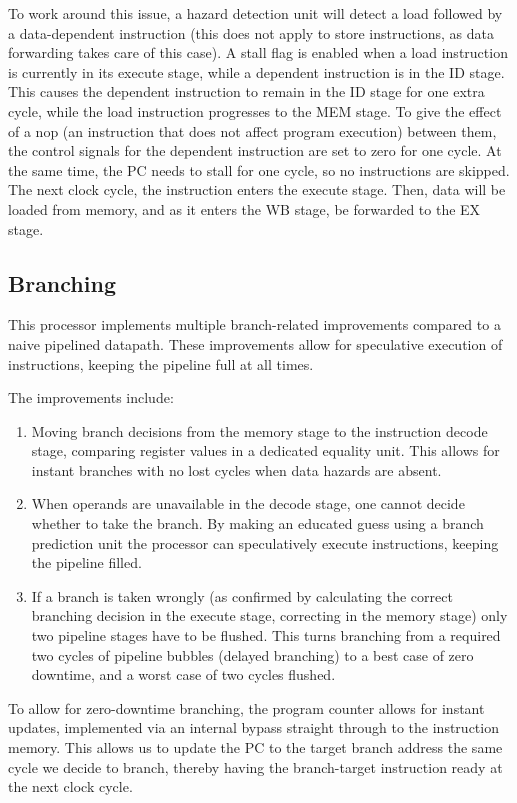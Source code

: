 To work around this issue, a hazard detection unit will detect a load followed by a data-dependent instruction (this does not apply to store instructions, as data forwarding takes care of this case).
A stall flag is enabled when a load instruction is currently in its execute stage, while a dependent instruction is in the ID stage.
This causes the dependent instruction to remain in the ID stage for one extra cycle, while the load instruction progresses to the MEM stage.
To give the effect of a nop (an instruction that does not affect program execution) between them, the control signals for the dependent instruction are set to zero for one cycle.
At the same time, the PC needs to stall for one cycle, so no instructions are skipped.
The next clock cycle, the instruction enters the execute stage.
Then, data will be loaded from memory, and as it enters the WB stage, be forwarded to the EX stage.

\subsection{Branching}

This processor implements multiple branch-related improvements compared to a naive pipelined datapath.
These improvements allow for speculative execution of instructions, keeping the pipeline full at all times.

The improvements include:
\begin{enumerate}
  \item
    Moving branch decisions from the memory stage to the instruction decode stage, comparing register values in a dedicated equality unit.
    This allows for instant branches with no lost cycles when data hazards are absent.
  \item
    When operands are unavailable in the decode stage, one cannot decide whether to take the branch.
    By making an educated guess using a branch prediction unit the processor can speculatively execute instructions, keeping the pipeline filled.
  \item
    If a branch is taken wrongly (as confirmed by calculating the correct branching decision in the execute stage, correcting in the memory stage) only two pipeline stages have to be flushed.
    This turns branching from a required two cycles of pipeline bubbles (delayed branching) to a best case of zero downtime, and a worst case of two cycles flushed.
\end{enumerate}

To allow for zero-downtime branching, the program counter allows for instant updates, implemented via an internal bypass straight through to the instruction memory.
This allows us to update the PC to the target branch address the same cycle we decide to branch, thereby having the branch-target instruction ready at the next clock cycle.

